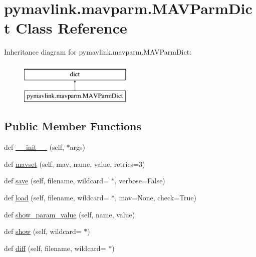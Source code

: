 \hypertarget{classpymavlink_1_1mavparm_1_1MAVParmDict}{}\section{pymavlink.\+mavparm.\+M\+A\+V\+Parm\+Dict Class Reference}
\label{classpymavlink_1_1mavparm_1_1MAVParmDict}
Inheritance diagram for pymavlink.\+mavparm.\+M\+A\+V\+Parm\+Dict\+:\begin{figure}[H]
\begin{center}
\leavevmode
\includegraphics[height=2.000000cm]{classpymavlink_1_1mavparm_1_1MAVParmDict}
\end{center}
\end{figure}
\subsection*{Public Member Functions}
\begin{DoxyCompactItemize}
\item 
def \mbox{\hyperlink{classpymavlink_1_1mavparm_1_1MAVParmDict_ad57039a57c457830445589005aa8bc98}{\+\_\+\+\_\+init\+\_\+\+\_\+}} (self, $\ast$args)
\item 
def \mbox{\hyperlink{classpymavlink_1_1mavparm_1_1MAVParmDict_aa041ae6aca1eaf554e068912dfd56cae}{mavset}} (self, mav, name, value, retries=3)
\item 
def \mbox{\hyperlink{classpymavlink_1_1mavparm_1_1MAVParmDict_a0f942689bbd320e3bf8201cb5b343ce0}{save}} (self, filename, wildcard=\textquotesingle{} $\ast$\textquotesingle{}, verbose=False)
\item 
def \mbox{\hyperlink{classpymavlink_1_1mavparm_1_1MAVParmDict_a08dd4eae81157f5940a29c86114f89c4}{load}} (self, filename, wildcard=\textquotesingle{} $\ast$\textquotesingle{}, mav=None, check=True)
\item 
def \mbox{\hyperlink{classpymavlink_1_1mavparm_1_1MAVParmDict_af2060e1b0249698bb61e841c1e923fb5}{show\+\_\+param\+\_\+value}} (self, name, value)
\item 
def \mbox{\hyperlink{classpymavlink_1_1mavparm_1_1MAVParmDict_a94a75c918aa0bbb2ef0b2562b9fa554e}{show}} (self, wildcard=\textquotesingle{} $\ast$\textquotesingle{})
\item 
def \mbox{\hyperlink{classpymavlink_1_1mavparm_1_1MAVParmDict_a61470ddc60a053270b7cc6ed8639f7c8}{diff}} (self, filename, wildcard=\textquotesingle{} $\ast$\textquotesingle{})
\end{DoxyCompactItemize}
